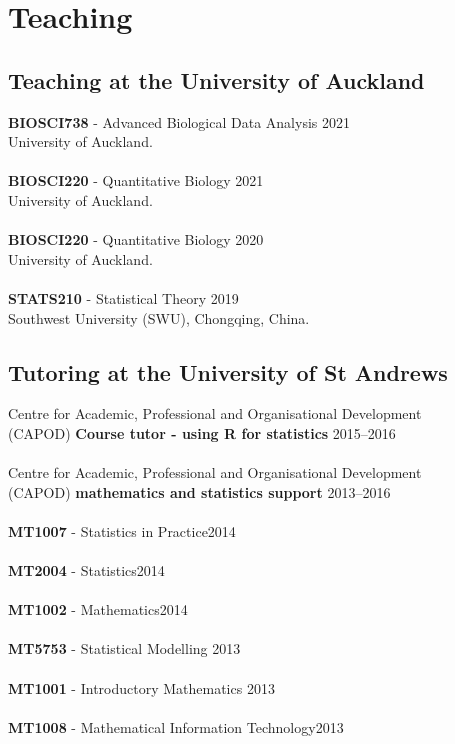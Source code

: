 \documentclass[10pt,letter]{article}
\begin{document}
 \section*{Teaching}
\vspace{1mm}
 \subsection*{Teaching at the University of Auckland}
 \vspace{1mm}
 \textbf{BIOSCI738} - Advanced Biological Data Analysis \hfill{2021} \\
 University of Auckland.\\
\hdashrule[0.5ex]{4cm}{1pt}{1pt}\\
 \textbf{BIOSCI220} - Quantitative Biology \hfill{2021} \\
 University of Auckland.\\
\hdashrule[0.5ex]{4cm}{1pt}{1pt}\\
 \textbf{BIOSCI220} - Quantitative Biology \hfill{2020} \\
 University of Auckland.\\
\hdashrule[0.5ex]{4cm}{1pt}{1pt}\\
 \textbf{STATS210} - Statistical Theory \hfill{2019} \\
 Southwest University (SWU), Chongqing, China.
 
\vspace{1mm}
 \subsection*{Tutoring at the University of St Andrews}
 \vspace{1mm}
 
 Centre for Academic, Professional and Organisational Development\\ (CAPOD) \textbf{Course tutor - using R for statistics} \hfill{2015--2016}\\
 \hdashrule[0.5ex]{4cm}{1pt}{1pt}\\
  Centre for Academic, Professional and Organisational Development\\ (CAPOD) \textbf{mathematics and statistics support} \hfill{2013--2016}\\
 \hdashrule[0.5ex]{4cm}{1pt}{1pt}\\
\textbf{MT1007} -  Statistics in Practice\hfill{2014}\\
 \hdashrule[0.5ex]{4cm}{1pt}{1pt}\\
  \textbf{MT2004} -  Statistics\hfill{2014}\\
 \hdashrule[0.5ex]{4cm}{1pt}{1pt}\\
  \textbf{MT1002} -  Mathematics\hfill{2014}\\
 \hdashrule[0.5ex]{4cm}{1pt}{1pt}\\
 \textbf{MT5753} -  Statistical Modelling \hfill{2013}\\
 \hdashrule[0.5ex]{4cm}{1pt}{1pt}\\
\textbf{MT1001} -  Introductory Mathematics \hfill{2013}\\
 \hdashrule[0.5ex]{4cm}{1pt}{1pt}\\
 \textbf{MT1008} -  Mathematical Information Technology\hfill{2013}\\
\end{document}

